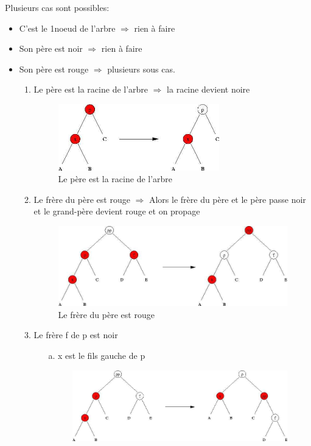 Plusieurs cas sont possibles:
\begin{itemize}
	\item C'est le 1\ier noeud de l'arbre $\Rightarrow$ rien à faire
	\item Son père est noir $\Rightarrow$ rien à faire
	\item Son père est rouge $\Rightarrow$ plusieurs sous cas.
		\begin{enumerate}
			\item Le père est la racine de l'arbre $\Rightarrow$ la racine devient noire
\begin{figure}[H]
	\centering
	\includegraphics[width=7cm]{content/schemas/arbreRNcas0.png}
	\caption{Le père est la racine de l'arbre}
\end{figure}
			\item Le frère du père est rouge $\Rightarrow$ Alors le frère du père et le père passe noir et le grand-père devient rouge et on propage
\begin{figure}[H]
	\centering
	\includegraphics[width=12.5cm]{content/schemas/arbreRNcas1.png}
	\caption{Le frère du père est rouge}
\end{figure}
			\item Le frère f de p est noir 
				\begin{enumerate}
					\item[a.] x est le fils gauche de p 
\begin{figure}[H]
	\centering
	\includegraphics[width=12.5cm]{content/schemas/arbreRNcas2a.png}

\end{figure}
\end{enumerate}
\end{enumerate}
\end{itemize}
